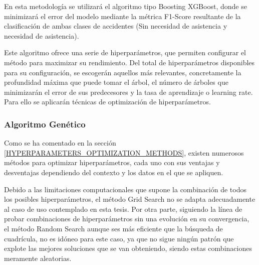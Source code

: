 \documentclass{uathesis-es}
\begin{document}
{	En esta metodología se utilizará el algoritmo tipo Boosting XGBoost, donde se minimizará el error del modelo mediante la métrica F1-Score resultante de la clasificación de ambas clases de accidentes (Sin necesidad de asistencia y necesidad de asistencia).
	
	Este algoritmo ofrece una serie de hiperparámetros, que permiten configurar el método para maximizar su rendimiento. Del total de hiperparámetros disponibles para su configuración, se escogerán aquellos más relevantes, concretamente la profundidad máxima que puede tomar el árbol, el número de árboles que minimizarán el error de sus predecesores y  la tasa de aprendizaje o learning rate. Para ello se aplicarán técnicas de optimización de hiperparámetros.
	
	
	
	
	
	\subsubsection{Algoritmo Genético}
	
	Como se ha comentado en la sección \ref{HYPERPARAMETERS_OPTIMIZATION_METHODS}, existen numerosos métodos para optimizar hiperparámetros, cada uno con sus ventajas y desventajas dependiendo del contexto y los datos en el que se apliquen.
	
	Debido a las limitaciones computacionales que supone la combinación de todos los posibles hiperparámetros, el método Grid Search no se adapta adecuadamente al caso de uso contemplado en esta tesis. Por otra parte, siguiendo la línea de probar combinaciones de hiperparámetros sin una evolución en su convergencia, el método Random Search aunque ses más eficiente que la búsqueda de cuadrícula, no es idóneo para este caso, ya que no sigue ningún patrón que explote las mejores soluciones que se van obteniendo, siendo estas combinaciones meramente aleatorias.
	
}
\end{document}
